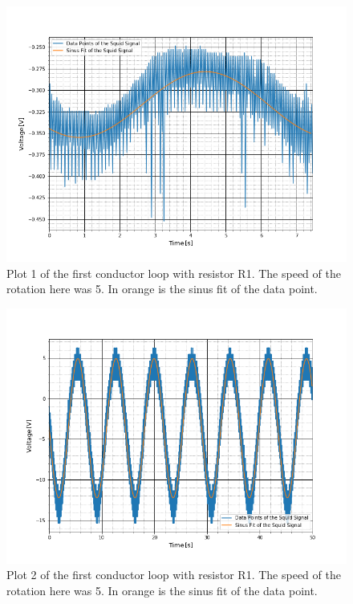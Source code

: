 \begin{figure}[ht]
	\includegraphics[scale=0.5]{Bild/r1_5_1}
	\centering
	\caption[Plot of first conductor loop 1]{Plot 1 of the first conductor loop with resistor R1. The speed of the rotation here was 5. In orange is the sinus fit of the data point.}
\end{figure}
\begin{figure}[ht]
	\includegraphics[scale=0.5]{Bild/r1_5_2}
	\centering
	\caption[Plot of first conductor loop 2 ]{Plot 2 of the first conductor loop with resistor R1. The speed of the rotation here was 5. In orange is the sinus fit of the data point.}
\end{figure}
